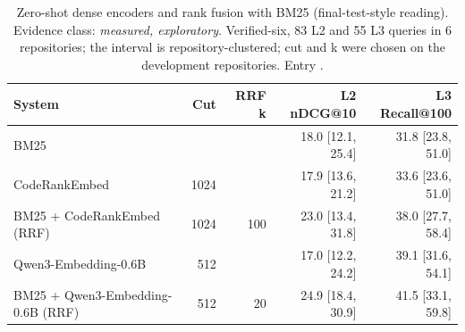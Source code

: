 \begin{table}[t]
\centering\small
\caption{Zero-shot dense encoders and rank fusion with BM25 (final-test-style reading). Evidence class: \emph{measured, exploratory}. Verified-six, 83 L2 and 55 L3 queries in 6 repositories; the interval is repository-clustered; cut and k were chosen on the development repositories. Entry .}
\label{tab:dense_fusion}
\begin{tabular}{lrrrr}
\toprule
System & Cut & RRF k & L2 nDCG@10 & L3 Recall@100 \\
\midrule
BM25 &  &  & 18.0 [12.1, 25.4] & 31.8 [23.8, 51.0] \\
CodeRankEmbed & 1024 &  & 17.9 [13.6, 21.2] & 33.6 [23.6, 51.0] \\
BM25 + CodeRankEmbed (RRF) & 1024 & 100 & 23.0 [13.4, 31.8] & 38.0 [27.7, 58.4] \\
Qwen3-Embedding-0.6B & 512 &  & 17.0 [12.2, 24.2] & 39.1 [31.6, 54.1] \\
BM25 + Qwen3-Embedding-0.6B (RRF) & 512 & 20 & 24.9 [18.4, 30.9] & 41.5 [33.1, 59.8] \\
\bottomrule
\end{tabular}
\end{table}
